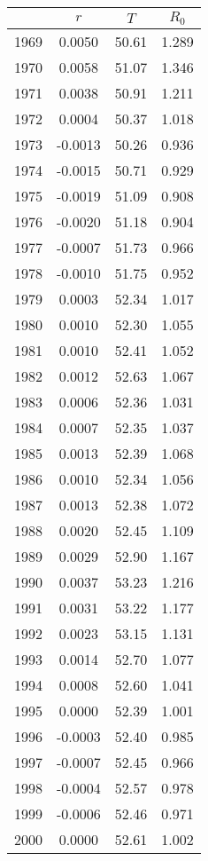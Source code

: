 \begin{tabular}{cccc}
  \hline
 & $r$ & $T$ & $R_0$ \\ 
  \hline
1969 & 0.0050 & 50.61 & 1.289 \\ 
  1970 & 0.0058 & 51.07 & 1.346 \\ 
  1971 & 0.0038 & 50.91 & 1.211 \\ 
  1972 & 0.0004 & 50.37 & 1.018 \\ 
  1973 & -0.0013 & 50.26 & 0.936 \\ 
  1974 & -0.0015 & 50.71 & 0.929 \\ 
  1975 & -0.0019 & 51.09 & 0.908 \\ 
  1976 & -0.0020 & 51.18 & 0.904 \\ 
  1977 & -0.0007 & 51.73 & 0.966 \\ 
  1978 & -0.0010 & 51.75 & 0.952 \\ 
  1979 & 0.0003 & 52.34 & 1.017 \\ 
  1980 & 0.0010 & 52.30 & 1.055 \\ 
  1981 & 0.0010 & 52.41 & 1.052 \\ 
  1982 & 0.0012 & 52.63 & 1.067 \\ 
  1983 & 0.0006 & 52.36 & 1.031 \\ 
  1984 & 0.0007 & 52.35 & 1.037 \\ 
  1985 & 0.0013 & 52.39 & 1.068 \\ 
  1986 & 0.0010 & 52.34 & 1.056 \\ 
  1987 & 0.0013 & 52.38 & 1.072 \\ 
  1988 & 0.0020 & 52.45 & 1.109 \\ 
  1989 & 0.0029 & 52.90 & 1.167 \\ 
  1990 & 0.0037 & 53.23 & 1.216 \\ 
  1991 & 0.0031 & 53.22 & 1.177 \\ 
  1992 & 0.0023 & 53.15 & 1.131 \\ 
  1993 & 0.0014 & 52.70 & 1.077 \\ 
  1994 & 0.0008 & 52.60 & 1.041 \\ 
  1995 & 0.0000 & 52.39 & 1.001 \\ 
  1996 & -0.0003 & 52.40 & 0.985 \\ 
  1997 & -0.0007 & 52.45 & 0.966 \\ 
  1998 & -0.0004 & 52.57 & 0.978 \\ 
  1999 & -0.0006 & 52.46 & 0.971 \\ 
  2000 & 0.0000 & 52.61 & 1.002 \\ 

\end{tabular}
